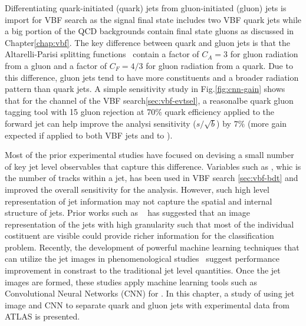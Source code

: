 Differentiating quark-initiated (quark) jets from gluon-initiated (gluon) jets is import for VBF \Hbb search as the signal final state includes two VBF quark jets while a big portion of the QCD backgrounds contain final state gluons as discussed in Chapter\ref{chap:vbf}. The key difference between quark and gluon jets is that the Altarelli-Parisi splitting functions~\cite{Altarelli:1977zs} contain a factor of $C_A=3$ for gluon radiation from a gluon and a factor of $C_F=4/3$ for gluon radiation from a quark. Due to this difference, gluon jets tend to have more constituents and a broader radiation pattern than quark jets. A simple sensitivity study in Fig.\ref{fig:cnn-gain} shows that for the \twocentral channel of the VBF \Hbb search\ref{sec:vbf-evtsel}, a reasonalbe quark gluon tagging tool with 15 gluon rejection at 70\% quark efficiency applied to the forward jet can help improve the analysi sensitivity ($s/\sqrt{b}$) by $7\%$ (more gain expected if applied to both VBF jets and to \fourcentral).

Most of the prior experimental studies have focused on devising a small number of key jet level observables that capture this difference. Variables such as \ntrk, whic is the number of tracks within a jet, has been used in VBF \Hbb search \ref{sec:vbf-bdt} and improved the overall sensitivity for the analysis. However, such high level representation of jet information may not capture the spatial and internal structure of jets. Prior works such as ~\cite{deOliveira:2015xxd} has suggested that an image representation of the jets with high granularity such that most of the individual costituent are visible could provide richer information for the classification problem. Recently, the development of powerful machine learning techniques that can utilize the jet images in phenomenological studies~\cite{Komiske:2016rsd,Dery:2017fap} suggest \qgtagging performance improvement in constrast to the traditional jet level quantities. Once the jet images are formed, these studies apply machine learning tools such as Convolutional Neural Networks (CNN) for \qgtagging. In this chapter, a study of using jet image and CNN to separate quark and gluon jets with experimental data from ATLAS is presented. 


